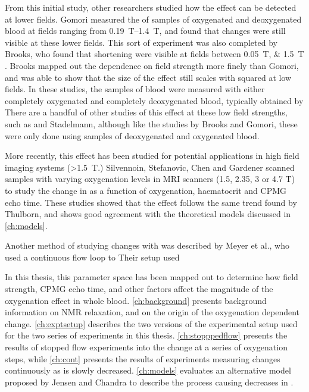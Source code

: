 From this initial study, other researchers studied how the effect can be detected at lower fields.
Gomori measured the \Ttwo of samples of oxygenated and deoxygenated blood at fields ranging from \SIrange{0.19}{1.4}{T}, and found that changes were still visible at these lower fields\cite{GomoriNMRRelaxationTimes1987}.
This sort of experiment was also completed by Brooks, who found that \Ttwo shortening were visible at fields between \SIlist{0.05;1.5}{T} \cite{BrooksComparisont2relaxation1995}.
Brooks mapped out the dependence on field strength more finely than Gomori, and was able to show that the size of the effect still scales with \Bzero squared at low fields.
In these studies, the samples of blood were measured with either completely oxygenated and completely deoxygenated blood, typically obtained by 
There are a handful of other studies of this effect at these low field strengths, such as \cite{BryantMagneticrelaxationblood1990} and Stadelmann\cite{StadelmannRelaxationtimesvenous1991},
although like the studies by Brooks and Gomori, these were only done using samples of deoxygenated and oxygenated blood.


More recently, this effect has been studied for potential applications in high field imaging systems (\SI{>1.5}{T}.)
Silvennoin\cite{JohannaSilvennoinenBloodNMRrelaxation2002}, Stefanovic\cite{StefanovicHumanwholebloodrelaxometry2004}, Chen\cite{ChenHumanwholeblood2009} and Gardener\cite{GardenerDependencebloodR22010} scanned samples with varying oxygenation levels in MRI scanners (1.5, 2.35, 3 or 4.7 T) to study the change in \Ttwo as a function of oxygenation, haematocrit and CPMG echo time.
These studies showed that the effect follows the same trend found by Thulborn, and shows good agreement with the theoretical models discussed in \autoref{ch:models}.

Another method of studying \Ttwo changes with \SOtwo was described by Meyer et al., who used a continuous flow loop to
Their setup used

In this thesis, this parameter space has been mapped out to determine how field strength, CPMG echo time, and other factors affect the magnitude of the oxygenation
\Ttwo effect in whole blood.
\autoref{ch:background} presents background information on NMR relaxation, and on the origin of the oxygenation dependent \Ttwo change.
\autoref{ch:exptsetup} describes the two versions of the experimental setup used for the two series of experiments in this thesis.
\autoref{ch:stopppedflow} presents the results of stopped flow experiments into the \Ttwo change at a series of oxygenation steps, while \autoref{ch:cont} presents the results of experiments measuring \Ttwo changes continuously as \SOtwo is slowly decreased.
\autoref{ch:models} evaluates an alternative model proposed by Jensen and Chandra to describe the process causing decreases in \Ttwo\cite{JensenNMRrelaxationtissues2000}.
